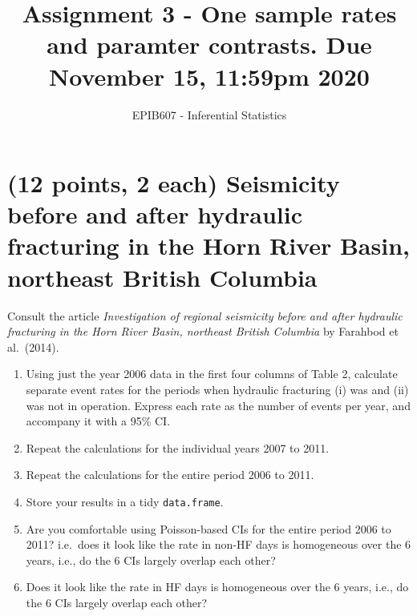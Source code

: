 \documentclass[letterpaper,12pt,twoside,]{pinp}
\title{Assignment 3 - One sample rates and paramter contrasts. Due November 15,
11:59pm 2020}
\author[a]{EPIB607 - Inferential Statistics}
\affil[a]{Fall 2020, McGill University}
\begin{document}
\verticaladjustment{-2pt}

\maketitle
\thispagestyle{firststyle}



\hypertarget{points-2-each-seismicity-before-and-after-hydraulic-fracturing-in-the-horn-river-basin-northeast-british-columbia}{%
\section{(12 points, 2 each) Seismicity before and after hydraulic
fracturing in the Horn River Basin, northeast British
Columbia}\label{points-2-each-seismicity-before-and-after-hydraulic-fracturing-in-the-horn-river-basin-northeast-british-columbia}}

Consult the article \emph{Investigation of regional seismicity before
and after hydraulic fracturing in the Horn River Basin, northeast
British Columbia} by Farahbod et al.~(2014).

\begin{enumerate}
\def\labelenumi{\alph{enumi})}
\item
  Using just the year 2006 data in the first four columns of Table 2,
  calculate separate event rates for the periods when hydraulic
  fracturing (i) was and (ii) was not in operation. Express each rate as
  the number of events per year, and accompany it with a 95\% CI.
\item
  Repeat the calculations for the individual years 2007 to 2011.
\item
  Repeat the calculations for the entire period 2006 to 2011.
\item
  Store your results in a tidy \texttt{data.frame}.
\item
  Are you comfortable using Poisson-based CIs for the entire period 2006
  to 2011? i.e.~does it look like the rate in non-HF days is homogeneous
  over the 6 years, i.e., do the 6 CIs largely overlap each other?
\item
  Does it look like the rate in HF days is homogeneous over the 6 years,
  i.e., do the 6 CIs largely overlap each other?
\end{enumerate}
\end{document}
